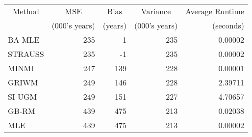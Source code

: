 
\begin{tabular}{lrrrr}
\toprule
\multicolumn{1}{c}{Method} & \multicolumn{1}{c}{MSE} & \multicolumn{1}{c}{Bias} & \multicolumn{1}{c}{Variance} & \multicolumn{1}{c}{Average Runtime} \\
\cmidrule(l{3pt}r{3pt}){1-1} \cmidrule(l{3pt}r{3pt}){2-2} \cmidrule(l{3pt}r{3pt}){3-3} \cmidrule(l{3pt}r{3pt}){4-4} \cmidrule(l{3pt}r{3pt}){5-5}
 & (000's years) & (years) & (000's years) & (seconds)\\
\midrule
BA-MLE & 235 & -1 & 235 & 0.00002\\
STRAUSS & 235 & -1 & 235 & 0.00002\\
MINMI & 247 & 139 & 228 & 0.00001\\
GRIWM & 249 & 146 & 228 & 2.39711\\
SI-UGM & 249 & 151 & 227 & 4.70657\\
\addlinespace
GB-RM & 439 & 475 & 213 & 0.02038\\
MLE & 439 & 475 & 213 & 0.00002\\
\bottomrule
\end{tabular}

